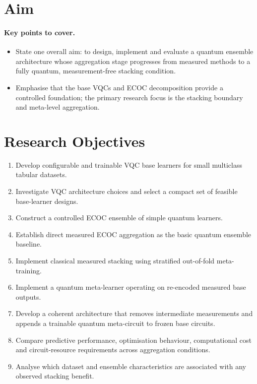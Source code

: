 \documentclass[]{UCD_CS_MSc_AAI_Report}
\newcommand{\sectionbrief}{\paragraph{Key points to cover.}}
\begin{document}
\section{Aim}
\label{sec:intro-aim}

\sectionbrief
\begin{itemize}
    \item State one overall aim: to design, implement and evaluate a quantum ensemble architecture whose aggregation stage progresses from measured methods to a fully quantum, measurement-free stacking condition.
    \item Emphasise that the base VQCs and ECOC decomposition provide a controlled foundation; the primary research focus is the stacking boundary and meta-level aggregation.
\end{itemize}

\section{Research Objectives}
\label{sec:intro-objectives}

\begin{enumerate}
    \item Develop configurable and trainable VQC base learners for small multiclass tabular datasets.
    \item Investigate VQC architecture choices and select a compact set of feasible base-learner designs.
    \item Construct a controlled ECOC ensemble of simple quantum learners.
    \item Establish direct measured ECOC aggregation as the basic quantum ensemble baseline.
    \item Implement classical measured stacking using stratified out-of-fold meta-training.
    \item Implement a quantum meta-learner operating on re-encoded measured base outputs.
    \item Develop a coherent architecture that removes intermediate measurements and appends a trainable quantum meta-circuit to frozen base circuits.
    \item Compare predictive performance, optimisation behaviour, computational cost and circuit-resource requirements across aggregation conditions.
    \item Analyse which dataset and ensemble characteristics are associated with any observed stacking benefit.
\end{enumerate}
\end{document}
